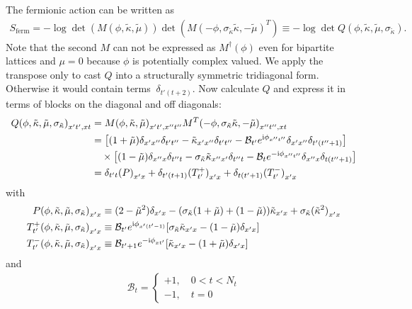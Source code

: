 \documentclass[a4paper, fleqn, twoside, notitlepage]{scrartcl}
\begin{document}
The fermionic action can be written as
\begin{align}
  S_\text{ferm} = - \log \det(M(\phi, \tilde{\kappa}, \tilde{\mu})) \det ({M(-\phi, \sigma_{\tilde{\kappa}}\tilde{\kappa}, -\tilde{\mu})}^T) \equiv - \log \det Q(\phi, \tilde{\kappa}, \tilde{\mu}, \sigma_{\tilde{\kappa}}).\label{eq:ferm_action_v2}
\end{align}
Note that the second $M$ can not be expressed as $M^\dagger(\phi)$ even for bipartite lattices and $\mu=0$ because $\phi$ is potentially complex valued. We apply the transpose only to cast $Q$ into a structurally symmetric tridiagonal form. Otherwise it would contain terms $~\delta_{t'(t+2)}$.
Now calculate $Q$ and express it in terms of blocks on the diagonal and off diagonals:
\begin{align}
  {Q(\phi, \tilde{\kappa}, \tilde{\mu}, \sigma_{\tilde{\kappa}})}_{x't',xt}
  &= {M(\phi, \tilde{\kappa}, \tilde{\mu})}_{x't',x''t''} {M^T(-\phi, \sigma_{\tilde{\kappa}}\tilde{\kappa}, -\tilde{\mu})}_{x''t'',xt}\\
  &= \big[(1+\tilde{\mu})\delta_{x'x''}\delta_{t't''} - \tilde{\kappa}_{x'x''}\delta_{t't''} - \mathcal{B}_{t'}e^{\mathrm{i}\phi_{x''t''}}\delta_{x'x''}\delta_{t'(t''+1)}\big] \nonumber\\
  &\quad\times \big[(1-\tilde{\mu})\delta_{x'' x}\delta_{t'' t} - \sigma_{\tilde{\kappa}}\tilde{\kappa}_{x'' x'}\delta_{t'' t} - \mathcal{B}_{t}e^{-\mathrm{i}\phi_{x''t''}}\delta_{x'' x}\delta_{t(t''+1)}\big]\\
  &= \delta_{t't}{(P)}_{x'x} + \delta_{t'(t+1)}{(T^+_{t'})}_{x'x} + \delta_{t(t'+1)}{(T^-_{t'})}_{x'x}
\end{align}
with
\begin{align}
  {P(\phi, \tilde{\kappa}, \tilde{\mu}, \sigma_{\tilde{\kappa}})}_{x'x} &\equiv (2-\tilde{\mu}^2)\delta_{x'x} - (\sigma_{\tilde{\kappa}}(1+\tilde{\mu}) + (1-\tilde{\mu}))\tilde{\kappa}_{x'x} + \sigma_{\tilde{\kappa}}{(\tilde{\kappa}^2)}_{x'x}\\
  {T^+_{t'}(\phi, \tilde{\kappa}, \tilde{\mu}, \sigma_{\tilde{\kappa}})}_{x'x} &\equiv \mathcal{B}_{t'}e^{\mathrm{i}\phi_{x'(t'-1)}}[\sigma_{\tilde{\kappa}}\tilde{\kappa}_{x'x} - (1-\tilde{\mu})\delta_{x'x}]\\
  {T^-_{t'}(\phi, \tilde{\kappa}, \tilde{\mu}, \sigma_{\tilde{\kappa}})}_{x'x} &\equiv \mathcal{B}_{t'+1}e^{-\mathrm{i}\phi_{xt'}}[\tilde{\kappa}_{x'x} - (1+\tilde{\mu})\delta_{x'x}]
\end{align}
and
\begin{align}
  \mathcal{B}_t =
  \begin{cases}
    +1,\quad 0 < t < N_t\\
    -1,\quad t = 0
  \end{cases}
\end{align}
\end{document}
